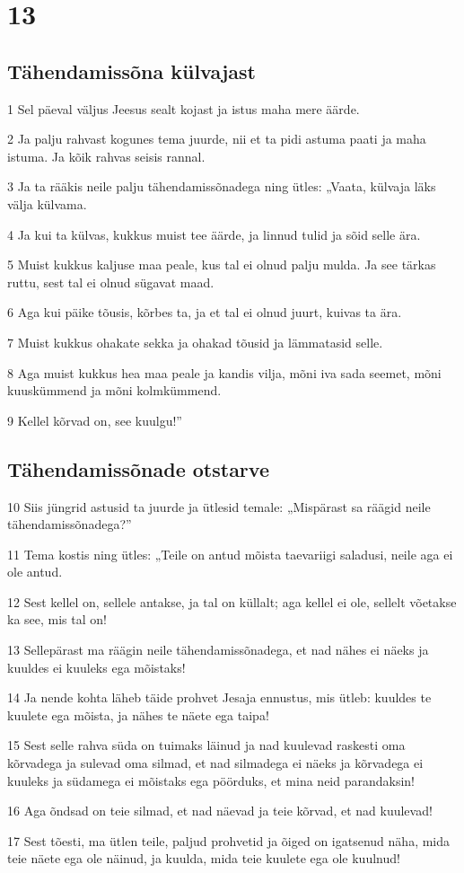 \chapter{13}

\section*{Tähendamissõna külvajast}

\par 1 Sel päeval väljus Jeesus sealt kojast ja istus maha mere äärde.
\par 2 Ja palju rahvast kogunes tema juurde, nii et ta pidi astuma paati ja maha istuma. Ja kõik rahvas seisis rannal.
\par 3 Ja ta rääkis neile palju tähendamissõnadega ning ütles: „Vaata, külvaja läks välja külvama.
\par 4 Ja kui ta külvas, kukkus muist tee äärde, ja linnud tulid ja sõid selle ära.
\par 5 Muist kukkus kaljuse maa peale, kus tal ei olnud palju mulda. Ja see tärkas ruttu, sest tal ei olnud sügavat maad.
\par 6 Aga kui päike tõusis, kõrbes ta, ja et tal ei olnud juurt, kuivas ta ära.
\par 7 Muist kukkus ohakate sekka ja ohakad tõusid ja lämmatasid selle.
\par 8 Aga muist kukkus hea maa peale ja kandis vilja, mõni iva sada seemet, mõni kuuskümmend ja mõni kolmkümmend.
\par 9 Kellel kõrvad on, see kuulgu!”

\section*{Tähendamissõnade otstarve}

\par 10 Siis jüngrid astusid ta juurde ja ütlesid temale: „Mispärast sa räägid neile tähendamissõnadega?”
\par 11 Tema kostis ning ütles: „Teile on antud mõista taevariigi saladusi, neile aga ei ole antud.
\par 12 Sest kellel on, sellele antakse, ja tal on küllalt; aga kellel ei ole, sellelt võetakse ka see, mis tal on!
\par 13 Sellepärast ma räägin neile tähendamissõnadega, et nad nähes ei näeks ja kuuldes ei kuuleks ega mõistaks!
\par 14 Ja nende kohta läheb täide prohvet Jesaja ennustus, mis ütleb: kuuldes te kuulete ega mõista, ja nähes te näete ega taipa!
\par 15 Sest selle rahva süda on tuimaks läinud ja nad kuulevad raskesti oma kõrvadega ja sulevad oma silmad, et nad silmadega ei näeks ja kõrvadega ei kuuleks ja südamega ei mõistaks ega pöörduks, et mina neid parandaksin!
\par 16 Aga õndsad on teie silmad, et nad näevad ja teie kõrvad, et nad kuulevad!
\par 17 Sest tõesti, ma ütlen teile, paljud prohvetid ja õiged on igatsenud näha, mida teie näete ega ole näinud, ja kuulda, mida teie kuulete ega ole kuulnud!

